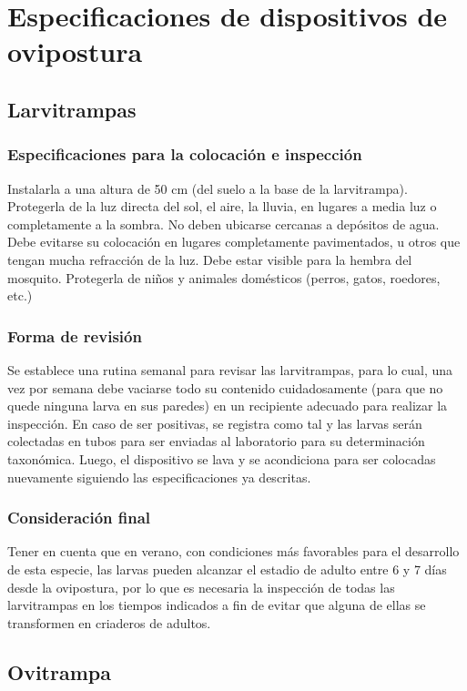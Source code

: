 \chapter{Especificaciones de dispositivos de ovipostura}

\section{Larvitrampas}

\subsection{Especificaciones para la colocación e inspección}
Instalarla a una altura de 50 cm (del suelo a la base de la larvitrampa).
Protegerla de la luz directa del sol, el aire, la lluvia, en lugares a
media luz o completamente a la sombra. No deben ubicarse cercanas a depósitos
de agua. Debe evitarse su colocación en lugares completamente pavimentados,
u otros que tengan mucha refracción de la luz. Debe estar visible para la
hembra del mosquito. Protegerla de niños y animales domésticos (perros,
gatos, roedores, etc.)

\subsection{Forma de revisión}
Se establece una rutina semanal para revisar las larvitrampas, para lo
cual, una vez por semana debe vaciarse todo su contenido cuidadosamente
(para que no quede ninguna larva en sus paredes) en un recipiente adecuado
para realizar la inspección. En caso de ser positivas, se registra como
tal y las larvas serán colectadas en tubos para ser enviadas al laboratorio
para su determinación taxonómica. Luego, el dispositivo se lava y se acondiciona
para ser colocadas nuevamente siguiendo las especificaciones ya descritas.


\subsection{Consideración final}
Tener en cuenta que en verano, con condiciones más favorables para el
desarrollo de esta especie, las larvas pueden alcanzar el estadio de
adulto entre 6 y 7 días desde la ovipostura, por lo que es necesaria la
inspección de todas las larvitrampas en los tiempos indicados a fin de
evitar que alguna de ellas se transformen en criaderos de adultos.

\section{Ovitrampa}

